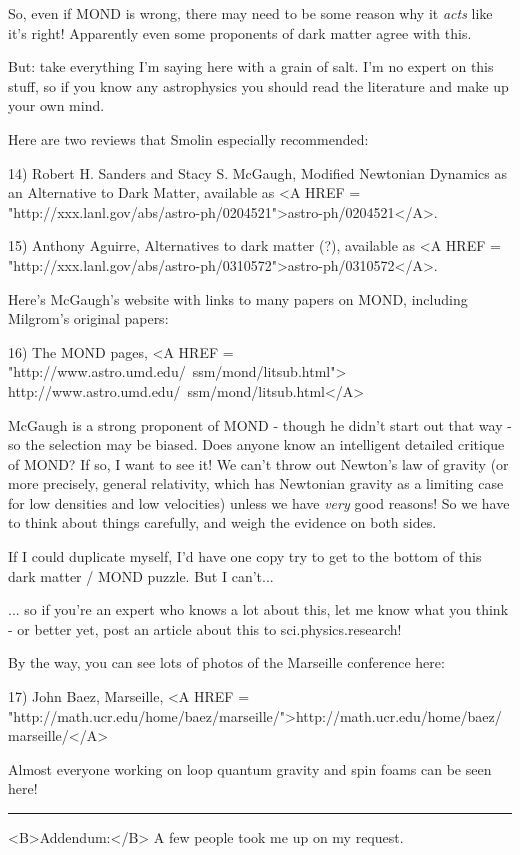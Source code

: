 So, even if MOND is wrong, there may need to be some reason why it 
\emph{acts}
like it's right!  Apparently even some proponents of dark matter agree 
with this.  

But: take everything I'm saying here with a grain of salt.  I'm no expert 
on this stuff, so if you know any astrophysics you should read the 
literature and make up your own mind.  

Here are two reviews that Smolin especially recommended:

14) Robert H. Sanders and Stacy S. McGaugh, Modified Newtonian Dynamics 
as an Alternative to Dark Matter, available as <A HREF = "http://xxx.lanl.gov/abs/astro-ph/0204521">astro-ph/0204521</A>.

15) Anthony Aguirre, Alternatives to dark matter (?), available as
<A HREF = "http://xxx.lanl.gov/abs/astro-ph/0310572">astro-ph/0310572</A>.

Here's McGaugh's website with links to many papers on MOND, including
Milgrom's original papers:

16) The MOND pages, 
<A HREF = "http://www.astro.umd.edu/~ssm/mond/litsub.html">
http://www.astro.umd.edu/~ssm/mond/litsub.html</A>

McGaugh is a strong proponent of MOND - though he didn't start out that
way - so the selection may be biased.  Does anyone know an intelligent 
detailed critique of MOND?  If so, I want to see it!  We can't throw out 
Newton's law of gravity (or more precisely, general relativity, which has 
Newtonian gravity as a limiting case for low densities and low velocities)
unless we have \emph{very} good reasons!  So we have to think about things
carefully, and weigh the evidence on both sides.

If I could duplicate myself, I'd have one copy try to get to the bottom
of this dark matter / MOND puzzle.  But I can't...

... so if you're an expert who knows a lot about this, let me 
know what you think - or better yet, post an article about this to 
sci.physics.research!

By the way, you can see lots of photos of the Marseille conference
here:

17) John Baez, Marseille, <A HREF = "http://math.ucr.edu/home/baez/marseille/">http://math.ucr.edu/home/baez/marseille/</A>

Almost everyone working on loop quantum gravity and spin foams can
be seen here!


\par\noindent\rule{\textwidth}{0.4pt}
<B>Addendum:</B>
A few people took me up on my request.  

